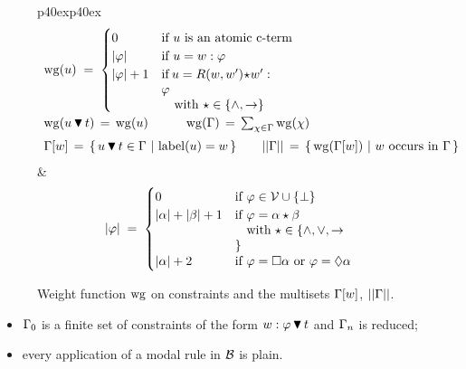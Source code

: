 \begin{figure}[t]
  \centering
  \begin{tabular}{p{40ex}p{40ex}}\small
    \[
    \begin{array}{l}
      \wg{u} \;=\;
      \begin{cases}
        0 & \mbox{if $u$ is an atomic c-term}
        \\
        \size{\varphi}& \mbox{if $u = w:\varphi$}
        \\
        \size{\varphi} + 1&\begin{minipage}[t]{20ex}
          if $u = R(w,w')\star w':\varphi$\par~~~with $\star\in \{\land,\to\}$
        \end{minipage}
      \end{cases}
      \\[7ex]
      \wg{u\abstractorder t}\,=\,\wg{u}
      \hspace{3em}
      \wg{\G}\,=\,\sum_{\chi\in\Gamma} \wg{\chi}
      \\[1.5ex]
      \G[w] \,=\,\{\, u  \abstractorder t\in\G~|~\mbox{$\lab{u} = w$}\,\}
      \qquad
      \sizem{\G} \,=\, \{\, \wg{\G[w]}~|~\mbox{$w$ occurs in $\G$}    \,\}
    \end{array}    
    \]
    &\small
    \[
    \size{\varphi} \;=\;
    \begin{cases}
      0 & \mbox{if $\varphi\in\PV\cup\{\bot\}$}
      \\
      \size{\a} + \size{\b} + 1 &\begin{minipage}[t]{20ex}
        if $\varphi=\a\star\b$\par~~~with $\star\in \{\land,\lor,\to\}$
      \end{minipage}
      \\[2ex]
      \size{\a} + 2 & \mbox{if $\varphi=\Box\a$ or $\varphi=\Diam\a$}
    \end{cases}
    \]
  \end{tabular}
  \vspace{-2ex}
\caption{Weight function $\mathrm{wg}$ on constraints and the multisets $\Gamma[w]$,  $||\Gamma||$.}
\label{fig:weight}
\end{figure}
  
\begin{itemize}[leftmargin=*]
\item $\Gamma_0$ is a finite set of constraints of the form
  $w:\varphi\,\blacktriangledown\, t$ and  $\Gamma_n$ is reduced;

\item every application of a modal rule in $\mathcal{B}$ is plain.
\end{itemize}

